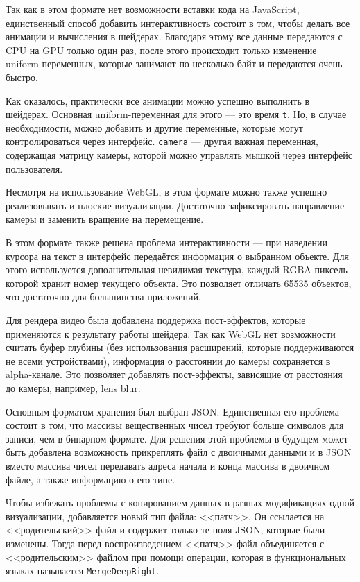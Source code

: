 Так как в этом формате нет возможности вставки кода на JavaScript, единственный способ добавить интерактивность состоит в том, чтобы делать все анимации и вычисления в шейдерах. Благодаря этому все данные передаются с CPU на GPU только один раз, после этого происходит только изменение uniform-переменных, которые занимают по несколько байт и передаются очень быстро.

Как оказалось, практически все анимации можно успешно выполнить в шейдерах. Основная uniform-переменная для этого --- это время \texttt{t}. Но, в случае необходимости, можно добавить и другие переменные, которые могут контролироваться через интерфейс. \texttt{camera} --- другая важная переменная, содержащая матрицу камеры, которой можно управлять мышкой через интерфейс пользователя.

Несмотря на использование WebGL, в этом формате можно также успешно реализовывать и плоские визуализации. Достаточно зафиксировать направление камеры и заменить вращение на перемещение.

В этом формате также решена проблема интерактивности --- при наведении курсора на текст в интерфейс передаётся информация о выбранном объекте. Для этого используется дополнительная невидимая текстура, каждый RGBA-пиксель которой хранит номер текущего объекта. Это позволяет отличать 65535 объектов, что достаточно для большинства приложений.

Для рендера видео была добавлена поддержка пост-эффектов, которые применяются к результату работы шейдера. Так как WebGL нет возможности считать буфер глубины (без использования расширений, которые поддерживаются не всеми устройствами), информация о расстоянии до камеры сохраняется в alpha-канале. Это позволяет добавлять пост-эффекты, зависящие от расстояния до камеры, например, lens blur.

Основным форматом хранения был выбран JSON. Единственная его проблема состоит в том, что массивы вещественных чисел требуют больше символов для записи, чем в бинарном формате. Для решения этой проблемы в будущем может быть добавлена возможность прикреплять файл с двоичными данными и в JSON вместо массива чисел передавать адреса начала и конца массива в двоичном файле, а также информацию о его типе.

Чтобы избежать проблемы с копированием данных в разных модификациях одной визуализации, добавляется новый тип файла: <<патч>>. Он ссылается на <<родительский>> файл и содержит только те поля JSON, которые были изменены. Тогда перед воспроизведением <<патч>>-файл объединяется с <<родительским>> файлом при помощи операции, которая в функциональных языках называется \texttt{MergeDeepRight}.

